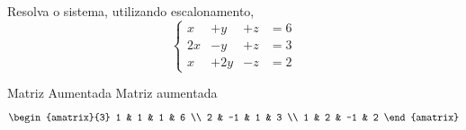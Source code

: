 \begin{question}
  Resolva o sistema, utilizando escalonamento,
  \[
    \left\{\begin{array}{rrrr}
      x  & +  y & + z & = 6 \\
      2x & -  y & + z & = 3 \\
      x  & + 2y & - z & = 2
    \end{array}\right.
  \]
\end{question}

\begin{resolution}{Matriz Aumentada}
  Matriz aumentada
  \[
    \begin{amatrix}{3}
      1 & 1  & 1  & 6 \\
      2 & -1 & 1  & 3 \\
      1 & 2  & -1 & 2
    \end{amatrix}
  \]
\end{resolution}

